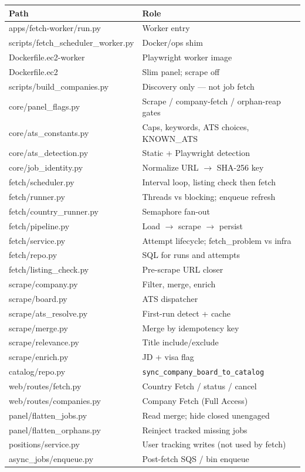 \documentclass[11pt,a4paper]{article}
\begin{document}
\begin{center}
\small
\begin{tabularx}{\textwidth}{>{\ttfamily}l X}
  \toprule
  \textrm{\textbf{Path}} & \textrm{\textbf{Role}} \\
  \midrule
  apps/fetch-worker/run.py &
    Worker entry \\
  scripts/fetch\_scheduler\_worker.py &
    Docker/ops shim \\
  Dockerfile.ec2-worker &
    Playwright worker image \\
  Dockerfile.ec2 &
    Slim panel; scrape off \\
  scripts/build\_companies.py &
    Discovery only --- not job fetch \\
  core/panel\_flags.py &
    Scrape / company-fetch / orphan-reap gates \\
  core/ats\_constants.py &
    Caps, keywords, ATS choices, KNOWN\_ATS \\
  core/ats\_detection.py &
    Static + Playwright detection \\
  core/job\_identity.py &
    Normalize URL $\rightarrow$ SHA-256 key \\
  fetch/scheduler.py &
    Interval loop, listing check then fetch \\
  fetch/runner.py &
    Threads vs blocking; enqueue refresh \\
  fetch/country\_runner.py &
    Semaphore fan-out \\
  fetch/pipeline.py &
    Load $\rightarrow$ scrape $\rightarrow$ persist \\
  fetch/service.py &
    Attempt lifecycle; fetch\_problem vs infra \\
  fetch/repo.py &
    SQL for runs and attempts \\
  fetch/listing\_check.py &
    Pre-scrape URL closer \\
  scrape/company.py &
    Filter, merge, enrich \\
  scrape/board.py &
    ATS dispatcher \\
  scrape/ats\_resolve.py &
    First-run detect + cache \\
  scrape/merge.py &
    Merge by idempotency key \\
  scrape/relevance.py &
    Title include/exclude \\
  scrape/enrich.py &
    JD + visa flag \\
  catalog/repo.py &
    \texttt{sync\_company\_board\_to\_catalog} \\
  web/routes/fetch.py &
    Country Fetch / status / cancel \\
  web/routes/companies.py &
    Company Fetch (Full Access) \\
  panel/flatten\_jobs.py &
    Read merge; hide closed unengaged \\
  panel/flatten\_orphans.py &
    Reinject tracked missing jobs \\
  positions/service.py &
    User tracking writes (not used by fetch) \\
  async\_jobs/enqueue.py &
    Post-fetch SQS / bin enqueue \\
  \bottomrule
\end{tabularx}
\end{center}
\end{document}
